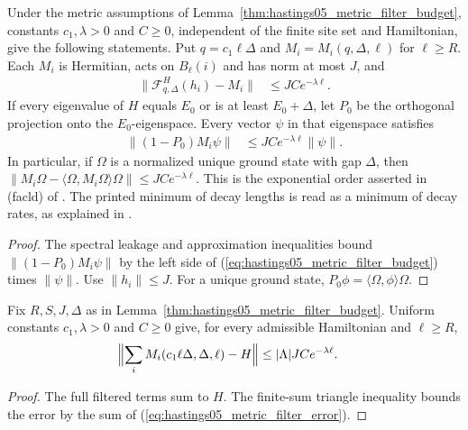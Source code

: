 \begin{theorem}
    \label{thm:hastings05_metric_facld}
    \leanok
    Under the metric assumptions of
    Lemma~\ref{thm:hastings05_metric_filter_budget}, constants
    $c_1,\lambda>0$ and $C\ge0$, independent of the finite site set and
    Hamiltonian, give the following statements. Put $q=c_1\ell\Delta$
    and $M_i=M_i(q,\Delta,\ell)$ for $\ell\ge R$.
    Each $M_i$ is Hermitian, acts on $B_\ell(i)$ and has norm at most $J$,
    and
    \begin{align}
        \|\mathcal F_{q,\Delta}^{H}(h_i)-M_i\| & \le JC e^{-\lambda\ell}.
        \label{eq:hastings05_metric_filter_error}
    \end{align}
    If every eigenvalue of $H$ equals $E_0$ or is at least $E_0+\Delta$,
    let $P_0$ be the orthogonal projection onto the $E_0$-eigenspace.
    Every vector $\psi$ in that eigenspace satisfies
    \begin{align}
        \|(1-P_0)M_i\psi\| & \le JC e^{-\lambda\ell}\|\psi\|.
        \label{eq:hastings05_metric_facld}
    \end{align}
    In particular, if $\Omega$ is a normalized unique ground state with
    gap $\Delta$, then
    $\|M_i\Omega-\langle\Omega,M_i\Omega\rangle\Omega\|
        \le JC e^{-\lambda\ell}$.
    This is the exponential order asserted in (facld) of
    \cite[lines 322--348]{Hastings2006Solving}. The printed minimum of
    decay lengths is read as a minimum of decay rates, as explained in
    \cite{gap:hastings05_truncated_dynamics}.
\end{theorem}
\begin{proof}\leanok
    The spectral leakage and approximation inequalities bound
    $\|(1-P_0)M_i\psi\|$ by the left side of
    (\ref{eq:hastings05_metric_filter_budget}) times $\|\psi\|$.
    Use $\|h_i\|\le J$. For a unique ground state,
    $P_0\phi=\langle\Omega,\phi\rangle\Omega$.
\end{proof}

\begin{theorem}
    \label{thm:hastings05_metric_filter_sum}
    \leanok
    Fix $R,S,J,\Delta$ as in
    Lemma~\ref{thm:hastings05_metric_filter_budget}. Uniform constants
    $c_1,\lambda>0$ and $C\ge0$ give, for every admissible Hamiltonian and
    $\ell\ge R$,
    \begin{align}
        \Bigl\|\sum_iM_i(c_1\ell\Delta,\Delta,\ell)-H\Bigr\|
         & \le|\Lambda|JC e^{-\lambda\ell}.
        \label{eq:hastings05_metric_filter_sum}
    \end{align}
\end{theorem}
\begin{proof}\leanok
    The full filtered terms sum to $H$. The finite-sum triangle
    inequality bounds the error by the sum of
    (\ref{eq:hastings05_metric_filter_error}).
\end{proof}


